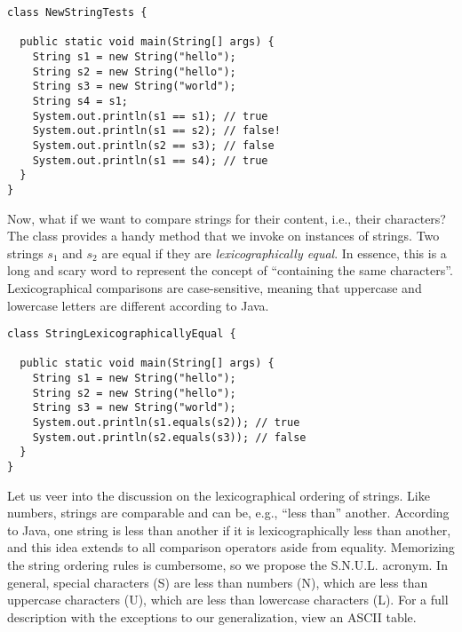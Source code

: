 \begin{cl}[]{}
\begin{lstlisting}[language=MyJava]
class NewStringTests {

  public static void main(String[] args) {
    String s1 = new String("hello");
    String s2 = new String("hello");
    String s3 = new String("world");
    String s4 = s1;
    System.out.println(s1 == s1); // true
    System.out.println(s1 == s2); // false!
    System.out.println(s2 == s3); // false
    System.out.println(s1 == s4); // true
  }
}
\end{lstlisting}
\end{cl}

Now, what if we want to compare strings for their content, i.e., their characters? The  class provides a handy  method that we invoke on instances of strings. Two strings $s_1$ and $s_2$ are equal if they are \textit{lexicographically equal}. In essence, this is a long and scary word to represent the concept of ``containing the same characters''. Lexicographical comparisons are case-sensitive, meaning that uppercase and lowercase letters are different according to Java.

\begin{cl}[]{}
\begin{lstlisting}[language=MyJava]
class StringLexicographicallyEqual {

  public static void main(String[] args) {
    String s1 = new String("hello");
    String s2 = new String("hello");
    String s3 = new String("world");
    System.out.println(s1.equals(s2)); // true
    System.out.println(s2.equals(s3)); // false
  }
}
\end{lstlisting}
\end{cl}

Let us veer into the discussion on the lexicographical ordering of strings. Like numbers, strings are comparable and can be, e.g., ``less than'' another. According to Java, one string is less than another if it is lexicographically less than another, and this idea extends to all comparison operators aside from equality. Memorizing the string ordering rules is cumbersome, so we propose the S.N.U.L. acronym. In general, special characters (S) are less than numbers (N), which are less than uppercase characters (U), which are less than lowercase characters (L). For a full description with the exceptions to our generalization, view an ASCII table. 


